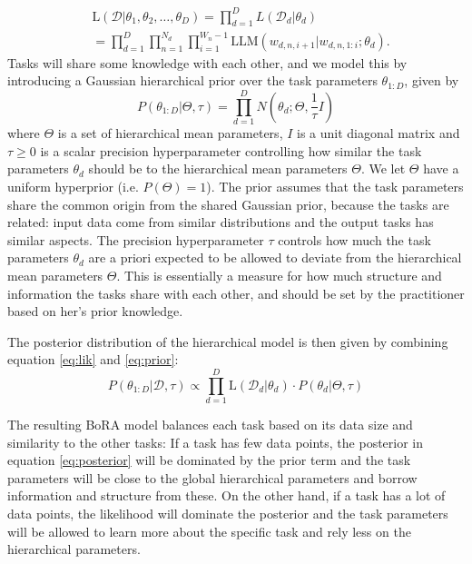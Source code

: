 \documentclass[fullpaper]{nldl}
\begin{document}
\begin{align}  \label{eq:lik}
    & \text{L}(\mathcal{D} | \theta_1, \theta_2, \ldots, \theta_D) = \prod_{d=1}^D L(\mathcal{D}_d | \theta_d) \nonumber \\
    &= \prod_{d=1}^D \prod_{n=1}^{N_d} \prod_{i=1}^{W_n-1} \text{LLM}(w_{d,n,i+1} | w_{d,n,1:i}; \theta_d).
\end{align}
%
%
Tasks will share some knowledge with each other, and we model this by introducing a Gaussian hierarchical prior over the task parameters $\theta_{1:D}$, given by
\begin{equation} \label{eq:prior}
    P(\theta_{1:D} | \Theta, \tau ) = \prod_{d=1}^D N(\theta_d ; \Theta, \frac{1}{\tau} I)
\end{equation}
%
where $\Theta$ is a set of hierarchical mean parameters, $I$ is a unit diagonal matrix and $\tau \geq 0$ is a scalar precision hyperparameter controlling how similar the task parameters $\theta_d$ should be to the hierarchical mean parameters $\Theta$.
We let $\Theta$ have a uniform hyperprior (i.e. $P(\Theta) = 1$). The prior assumes that the task parameters share the common origin from the shared Gaussian prior, because the tasks are related: input data come from similar distributions and the output tasks has similar aspects. 
The precision hyperparameter $\tau$ controls how much the task parameters $\theta_d$ are a priori expected to be allowed to deviate from the hierarchical mean parameters $\Theta$. 
This is essentially a measure for how much structure and information the tasks share with each other, and should be set by the practitioner based on her's prior knowledge.

The posterior distribution of the hierarchical model is then given by combining equation \ref{eq:lik} and \ref{eq:prior}:
\begin{equation} \label{eq:posterior}
    P(\theta_{1:D} | \mathcal{D}, \tau) \propto \prod_{d=1}^D \text{L}(\mathcal{D}_d | \theta_d) \cdot P(\theta_d | \Theta, \tau)
\end{equation}
%
%

The resulting BoRA model balances each task based on its data size and similarity to the other tasks: If a task has few data points, the posterior in equation \ref{eq:posterior} will be dominated by the prior term and the task parameters will be close to the global hierarchical parameters and borrow information and structure from these. On the other hand, if a task has a lot of data points, the likelihood will dominate the posterior and the task parameters will be allowed to learn more about the specific task and rely less on the hierarchical parameters.
\end{document}

